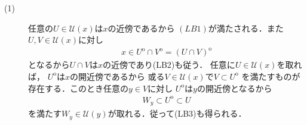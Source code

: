 	\begin{prf}\mbox{}
		\begin{description}
			\item[(1)] 任意の$U \in \mathscr{U}(x)$は$x$の近傍であるから
				$(LB1)$が満たされる．また$U,V \in \mathscr{U}(x)$に対し
				\begin{align}
					x \in U^{\mathrm{o}} \cap V^{\mathrm{o}} = (U \cap V)^{\mathrm{o}}
				\end{align}
				となるから$U \cap V$は$x$の近傍であり(LB2)も従う．
				任意に$U \in \mathscr{U}(x)$を取れば，
				$U^{\mathrm{o}}$は$x$の開近傍であるから
				或る$V \in \mathscr{U}(x)$で$V \subset U^{\mathrm{o}}$
				を満たすものが存在する．このとき任意の$y \in V$に対し
				$U^{\mathrm{o}}$は$y$の開近傍となるから
				\begin{align}
					W_y \subset U^{\mathrm{o}} \subset U
				\end{align}
				を満たす$W_y \in \mathscr{U}(y)$が取れる．従って(LB3)も得られる．
			

\end{description}
\end{prf}
